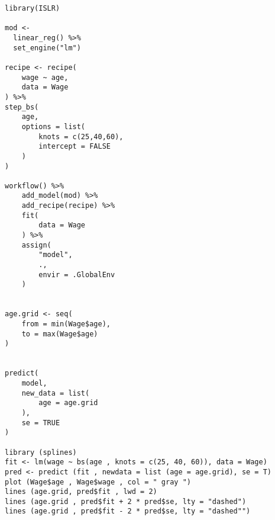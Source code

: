 \documentclass[
]{book}
\begin{document}
\begin{verbatim}
library(ISLR)

mod <- 
  linear_reg() %>% 
  set_engine("lm")

recipe <- recipe(
    wage ~ age,
    data = Wage
) %>%
step_bs(
    age,
    options = list(
        knots = c(25,40,60),
        intercept = FALSE
    )
)

workflow() %>%
    add_model(mod) %>%
    add_recipe(recipe) %>%
    fit(
        data = Wage
    ) %>%
    assign(
        "model",
        .,
        envir = .GlobalEnv
    )


age.grid <- seq(
    from = min(Wage$age), 
    to = max(Wage$age)
)


predict(
    model,
    new_data = list(
        age = age.grid
    ),
    se = TRUE
)

library (splines)
fit <- lm(wage ~ bs(age , knots = c(25, 40, 60)), data = Wage)
pred <- predict (fit , newdata = list (age = age.grid), se = T)
plot (Wage$age , Wage$wage , col = " gray ")
lines (age.grid, pred$fit , lwd = 2)
lines (age.grid , pred$fit + 2 * pred$se, lty = "dashed")
lines (age.grid , pred$fit - 2 * pred$se, lty = "dashed"")
\end{verbatim}

\backmatter
\end{document}
